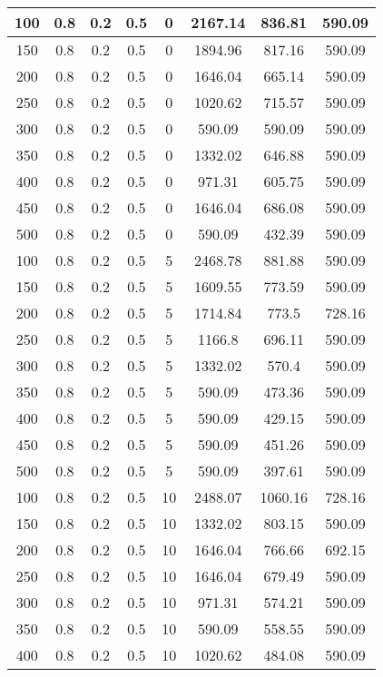 \documentclass[a4paper, 12pt]{extreport}
\begin{document}
\begin{itemize}
\begin{longtable}{|c|c|c|c|c|c|c|c|}
			100 & 0.8 & 0.2 & 0.5 & 0 & 2167.14 & 836.81 & 590.09 \\\hline
			150 & 0.8 & 0.2 & 0.5 & 0 & 1894.96 & 817.16 & 590.09 \\\hline
			200 & 0.8 & 0.2 & 0.5 & 0 & 1646.04 & 665.14 & 590.09 \\\hline
			250 & 0.8 & 0.2 & 0.5 & 0 & 1020.62 & 715.57 & 590.09 \\\hline
			300 & 0.8 & 0.2 & 0.5 & 0 & 590.09 & 590.09 & 590.09 \\\hline
			350 & 0.8 & 0.2 & 0.5 & 0 & 1332.02 & 646.88 & 590.09 \\\hline
			400 & 0.8 & 0.2 & 0.5 & 0 & 971.31 & 605.75 & 590.09 \\\hline
			450 & 0.8 & 0.2 & 0.5 & 0 & 1646.04 & 686.08 & 590.09 \\\hline
			500 & 0.8 & 0.2 & 0.5 & 0 & 590.09 & 432.39 & 590.09 \\\hline
			100 & 0.8 & 0.2 & 0.5 & 5 & 2468.78 & 881.88 & 590.09 \\\hline
			150 & 0.8 & 0.2 & 0.5 & 5 & 1609.55 & 773.59 & 590.09 \\\hline
			200 & 0.8 & 0.2 & 0.5 & 5 & 1714.84 & 773.5 & 728.16 \\\hline
			250 & 0.8 & 0.2 & 0.5 & 5 & 1166.8 & 696.11 & 590.09 \\\hline
			300 & 0.8 & 0.2 & 0.5 & 5 & 1332.02 & 570.4 & 590.09 \\\hline
			350 & 0.8 & 0.2 & 0.5 & 5 & 590.09 & 473.36 & 590.09 \\\hline
			400 & 0.8 & 0.2 & 0.5 & 5 & 590.09 & 429.15 & 590.09 \\\hline
			450 & 0.8 & 0.2 & 0.5 & 5 & 590.09 & 451.26 & 590.09 \\\hline
			500 & 0.8 & 0.2 & 0.5 & 5 & 590.09 & 397.61 & 590.09 \\\hline
			100 & 0.8 & 0.2 & 0.5 & 10 & 2488.07 & 1060.16 & 728.16 \\\hline
			150 & 0.8 & 0.2 & 0.5 & 10 & 1332.02 & 803.15 & 590.09 \\\hline
			200 & 0.8 & 0.2 & 0.5 & 10 & 1646.04 & 766.66 & 692.15 \\\hline
			250 & 0.8 & 0.2 & 0.5 & 10 & 1646.04 & 679.49 & 590.09 \\\hline
			300 & 0.8 & 0.2 & 0.5 & 10 & 971.31 & 574.21 & 590.09 \\\hline
			350 & 0.8 & 0.2 & 0.5 & 10 & 590.09 & 558.55 & 590.09 \\\hline
			400 & 0.8 & 0.2 & 0.5 & 10 & 1020.62 & 484.08 & 590.09 \\\hline

\end{longtable}
\end{itemize}
\end{document}
